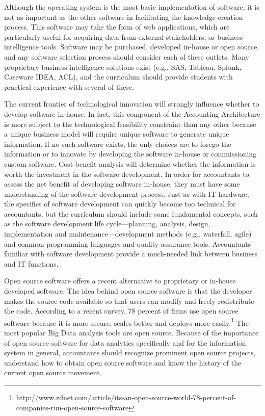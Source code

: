 \documentclass[12pt]{article}
\begin{document}
Although the operating system is the most basic implementation of software, it is not as important as the other software in facilitating the knowledge-creation process. This software may take the form of web applications, which are particularly useful for acquiring data from external stakeholders, or business intelligence tools. Software may be purchased, developed in-house or open source, and any software selection process should consider each of these outlets. Many proprietary business intelligence solutions exist (e.g., SAS, Tableau, Splunk, Caseware IDEA, ACL), and the curriculum should provide students with practical experience with several of these.

The current frontier of technological innovation will strongly influence whether to develop software in-house. In fact, this component of the Accounting Architecture is more subject to the technological feasibility constraint than any other because a unique business model will require unique software to generate unique information. If no such software exists, the only choices are to forego the information or to innovate by developing the software in-house or commissioning custom software. Cost-benefit analysis will determine whether the information is worth the investment in the software development. In order for accountants to assess the net benefit of developing software in-house, they must have some understanding of the software development process. Just as with IT hardware, the specifics of software development can quickly become too technical for accountants, but the curriculum should include some fundamental concepts, such as the software development life cycle---planning, analysis, design, implementation and maintenance---development methods (e.g., waterfall, agile) and common programming languages and quality assurance tools. Accountants familiar with software development provide a much-needed link between business and IT functions.

Open source software offers a recent alternative to proprietary or in-house developed software. The idea behind open source software is that the developer makes the source code available so that users can modify and freely redistribute the code. According to a recent survey, 78 percent of firms use open source software because it is more secure, scales better and deploys more easily.\footnote{http://www.zdnet.com/article/its-an-open-source-world-78-percent-of-companies-run-open-source-software} The most popular Big Data analysis tools are open source. Because of the importance of open source software for data analytics specifically and for the information system in general, accountants should recognize prominent open source projects, understand how to obtain open source software and know the history of the current open source movement.
\end{document}
